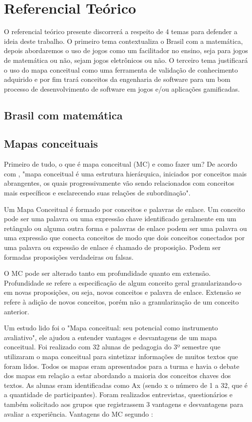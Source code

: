 \chapter[Referencial Teórico]{Referencial Teórico}
O referencial teórico presente discorrerá a respeito de 4 temas para defender a ideia deste trabalho. O primeiro tema contextualiza o Brasil com a matemática, depois abordaremos o uso de jogos como um facilitador no ensino, seja para jogos de matemática ou não, sejam jogos eletrônicos ou não. O terceiro tema justificará o uso do mapa conceitual como uma ferramenta de validação de conhecimento adquirido e por fim trará conceitos da engenharia de software para um bom processo de desenvolvimento de software em jogos e/ou aplicações gamificadas. 

\section[Brasil com matemática]{Brasil com matemática}


\section[Mapas Conceituais]{Mapas conceituais}

Primeiro de tudo, o que é mapa conceitual (MC) e como fazer um? De acordo com , "mapa conceitual é uma estrutura hierárquica, iniciados por conceitos mais abrangentes, os quais progressivamente vão sendo relacionados com conceitos mais específicos e esclarecendo suas relações de subordinação". 

Um Mapa Conceitual é formado por conceitos e palavras de enlace. Um conceito pode ser uma palavra ou uma expressão chave identificado geralmente em um retângulo ou alguma outra forma e palavras de enlace podem ser uma palavra ou uma expressão que conecta conceitos de modo que dois conceitos conectados por uma palavra ou expessão de enlace é chamado de proposição. Podem ser formadas proposições verdadeiras ou falsas.

O MC pode ser alterado tanto em profundidade quanto em extensão. Profundidade se refere a especificação de algum conceito geral granularizando-o em novas proposições, ou seja, novos conceitos e palavra de enlace. Extensão se refere à adição de novos conceitos, porém não a granularização de um conceito anterior.


Um estudo lido foi o "Mapa conceitual: seu potencial como instrumento avaliativo", ele ajudou a entender vantages e desvantagens de um mapa conceitual. Foi realizado com 32 alunas de pedagogia do 3º semestre que utilizaram o mapa conceitual para sintetizar informações de muitos textos que foram lidos. Todos os mapas eram apresentados para a turma e havia o debate dos mapas em relação a estar abordando a maioria dos conceitos chaves dos textos. As alunas eram identificadas como Ax (sendo x o número de 1 a 32, que é a quantidade de participantes). Foram realizados entrevistas, questionários e também solicitado aos grupos que registrassem 3 vantagens e desvantagens para avaliar a experiência. Vantagens do MC segundo \cite{vantagensDesvantagensMC}: 

